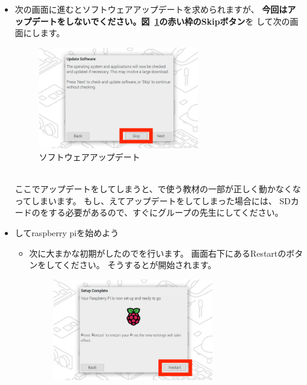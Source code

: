 \begin{itemize}
  \item 次の画面に進むとソフトウェアアップデートを求められますが、
  \textbf{今回はアップデートをしないでください。図~\ref{fig:17}の}\textbf{\color{red}赤い枠のSkipボタン}を
  して次の画面にします。
  \begin{figure}[h]
    \centering
    \begin{minipage}{5.228cm}
      \includegraphics[width=7.000cm]{text01-img/sw_image07.png}
      \caption{ソフトウェアアップデート}\label{fig:17}
    \end{minipage}
  \end{figure}
  \\ここでアップデートをしてしまうと、で使う教材の一部が正しく動かなくなってしまいます。
  もし、えてアップデートをしてしまった場合には、
  SDカードのをする必要があるので、すぐにグループの先生にしてください。
\end{itemize}
\clearpage

\begin{itemize}
  \item {}してraspberry piを始めよう
  \begin{itemize}
    \item 次に大まかな初期がしたのでを行います。
    画面右下にあるRestartのボタンをしてください。
    そうするとが開始されます。
    \begin{figure}[h]
      \centering
      \begin{minipage}{5.228cm}
        \includegraphics[width=7.000cm]{text01-img/sw_image08.png}
        \caption{ }
      \end{minipage}
    \end{figure}
  \end{itemize}
\end{itemize}




